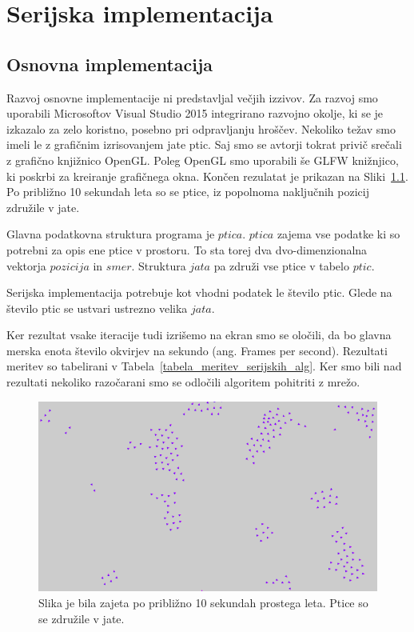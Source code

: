 \documentclass[a4paper, 12pt]{book}
\begin{document}
\chapter{Serijska implementacija}
\label{ch1}
\section{Osnovna implementacija}
Razvoj osnovne implementacije ni predstavljal večjih izzivov. Za razvoj smo uporabili Microsoftov Visual Studio 2015 integrirano razvojno okolje, ki se je izkazalo za zelo koristno, posebno pri odpravljanju hroščev. Nekoliko težav smo imeli le z grafičnim izrisovanjem jate ptic. Saj smo se avtorji tokrat privič srečali z grafično knjižnico OpenGL. Poleg OpenGL smo uporabili še GLFW knižnjico, ki poskrbi za kreiranje grafičnega okna. Končen rezulatat je prikazan na Sliki~\ref{img:flocking_simulation_demo}. Po približno 10 sekundah leta so se ptice, iz popolnoma naključnih pozicij združile v jate.

Glavna podatkovna struktura programa je $ptica$. $ptica$ zajema vse podatke ki so potrebni za opis ene ptice v prostoru. To sta torej dva dvo-dimenzionalna vektorja $pozicija$ in $smer$. Struktura $jata$ pa združi vse ptice v tabelo $ptic$.

Serijska implementacija potrebuje kot vhodni podatek le število ptic. Glede na število ptic se ustvari ustrezno velika $jata$.

Ker rezultat vsake iteracije tudi izrišemo na ekran smo se oločili, da bo glavna merska enota število okvirjev na sekundo (ang. Frames per second). Rezultati meritev so tabelirani v Tabela~\ref{tabela_meritev_serijskih_alg}. Ker smo bili nad rezultati nekoliko razočarani smo se odločili algoritem pohitriti z mrežo.

\begin{figure}[t]
\includegraphics[width=\textwidth]{flocking_simulation_demo}
\caption{Slika je bila zajeta po približno 10 sekundah prostega leta. Ptice so se združile v jate.}
\label{img:flocking_simulation_demo}
\centering
\end{figure}
\end{document}
